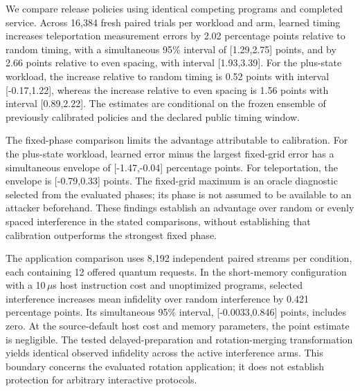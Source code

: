 
 We compare release policies using identical competing programs and completed service. Across 16,384 fresh paired trials per workload and arm, learned timing increases teleportation measurement errors by 2.02 percentage points relative to random timing, with a simultaneous 95\% interval of [1.29,2.75] points, and by 2.66 points relative to even spacing, with interval [1.93,3.39]. For the plus-state workload, the increase relative to random timing is 0.52 points with interval [-0.17,1.22], whereas the increase relative to even spacing is 1.56 points with interval [0.89,2.22]. The estimates are conditional on the frozen ensemble of previously calibrated policies and the declared public timing window.

 The fixed-phase comparison limits the advantage attributable to calibration. For the plus-state workload, learned error minus the largest fixed-grid error has a simultaneous envelope of [-1.47,-0.04] percentage points. For teleportation, the envelope is [-0.79,0.33] points. The fixed-grid maximum is an oracle diagnostic selected from the evaluated phases; its phase is not assumed to be available to an attacker beforehand. These findings establish an advantage over random or evenly spaced interference in the stated comparisons, without establishing that calibration outperforms the strongest fixed phase.

 The application comparison uses 8,192 independent paired streams per condition, each containing 12 offered quantum requests. In the short-memory configuration with a 10\,$\mu$s host instruction cost and unoptimized programs, selected interference increases mean infidelity over random interference by 0.421 percentage points. Its simultaneous 95\% interval, [-0.0033,0.846] points, includes zero. At the source-default host cost and memory parameters, the point estimate is negligible. The tested delayed-preparation and rotation-merging transformation yields identical observed infidelity across the active interference arms. This boundary concerns the evaluated rotation application; it does not establish protection for arbitrary interactive protocols.

